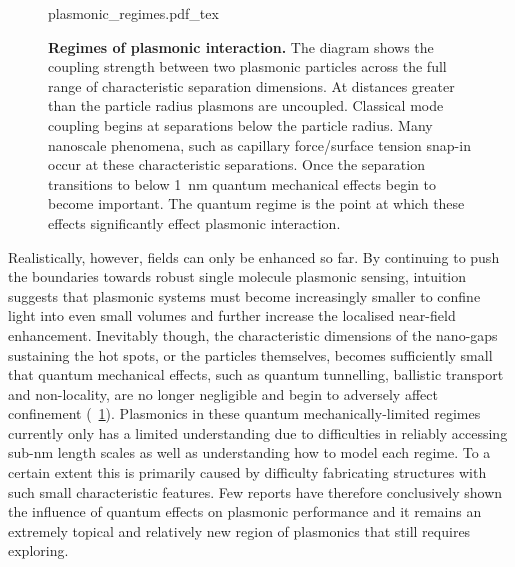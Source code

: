 \documentclass[12pt, a4paper, twoside]{book}
\begin{document}
\begin{figure}[bt]
\centering
\fontsize{10pt}{1em}\selectfont
{plasmonic_regimes.pdf_tex}
\caption[Regimes of plasmonic interaction.]{\textbf{Regimes of plasmonic interaction.} The diagram shows the coupling strength between two plasmonic particles across the full range of characteristic separation dimensions. At distances greater than the particle radius plasmons are uncoupled. Classical mode coupling begins at separations below the particle radius. Many nanoscale phenomena, such as capillary force/surface tension snap-in occur at these characteristic separations. Once the separation transitions to below \SI{1}{nm} quantum mechanical effects begin to become important. The quantum regime is the point at which these effects significantly effect plasmonic interaction.}
\label{fig:plasmonic_regimes}
\vspace{-10pt}
\end{figure}

Realistically, however, fields can only be enhanced so far. By continuing to push the boundaries towards robust single molecule plasmonic sensing, intuition suggests that plasmonic systems must become increasingly smaller to confine light into even small volumes and further increase the localised near-field enhancement. Inevitably though, the characteristic dimensions of the nano-gaps sustaining the hot spots, or the particles themselves, becomes sufficiently small that quantum mechanical effects, such as quantum tunnelling, ballistic transport and non-locality, are no longer negligible and begin to adversely affect confinement (\figurename~\ref{fig:plasmonic_regimes}). Plasmonics in these quantum mechanically-limited regimes currently only has a limited understanding due to difficulties in reliably accessing sub-nm length scales as well as understanding how to model each regime. To a certain extent this is primarily caused by difficulty fabricating structures with such small characteristic features. Few reports have therefore conclusively shown the influence of quantum effects on plasmonic performance and it remains an extremely topical and relatively new region of plasmonics that still requires exploring.
\end{document}
